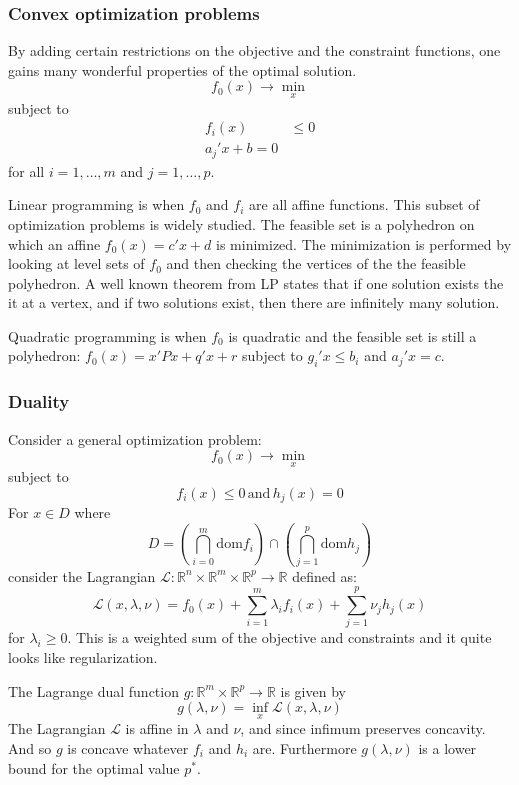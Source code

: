 \documentclass[a4paper]{article}
\newcommand{\Real}{\mathbb{R}}
\newcommand{\Lcal}{\mathcal{L}}
\begin{document}

\subsubsection{Convex optimization problems} %
\label{ssub:convex_optimization_problems}

By adding certain restrictions on the objective and the constraint functions, one gains
many wonderful properties of the optimal solution.
\[ f_0(x) \to \min_x \]
subject to
\begin{align*}
	f_i(x) &\leq 0 \\
	a_j'x + b = 0
\end{align*}
for all $i=1,\ldots, m$ and $j=1,\ldots,p$.

Linear programming is when $f_0$ and $f_i$ are all affine functions. This subset of
optimization problems is widely studied. The feasible set is a polyhedron on which
an affine $f_0(x) =c'x + d$ is minimized. The minimization is performed by looking
at level sets of $f_0$ and then checking the vertices of the the feasible polyhedron.
A well known theorem from LP states that if one solution exists the it at a vertex,
and if two solutions exist, then there are infinitely many solution.

Quadratic programming is when $f_0$ is quadratic and the feasible set is still a
polyhedron: $f_0(x) = x'Px + q'x + r$ subject to $g_i'x\leq b_i$ and $a_j'x=c$.


\subsubsection{Duality} %
\label{ssub:duality}

Consider a general optimization problem:
\[ f_0(x) \to \min_x\]
subject to
\[ f_i(x) \leq 0\,\text{and}\, h_j(x) = 0\]
For $x\in D$ where 
\[D = (\bigcap_{i=0}^m \text{dom} f_i) \cap (\bigcap_{j=1}^p \text{dom} h_j)\]
consider the Lagrangian $\Lcal: \Real^n\times \Real^m\times\Real^p\to\Real$ defined as:
\[\Lcal(x,\lambda, \nu) = f_0(x) + \sum_{i=1}^m \lambda_i f_i(x) + \sum_{j=1}^p \nu_j h_j(x)\]
for $\lambda_i\geq 0$. This is a weighted sum of the objective and constraints and
it quite looks like regularization.

The Lagrange dual function $g:\Real^m\times \Real^p\to\Real$ is given by
\[g(\lambda,\nu) = \inf_x \Lcal(x,\lambda,\nu)\]
The Lagrangian $\Lcal$ is affine in $\lambda$ and $\nu$, and since infimum preserves
concavity. And so $g$ is concave whatever $f_i$ and $h_i$ are. Furthermore $g(\lambda,\nu)$
is a lower bound for the optimal value $p^*$.
\end{document}
